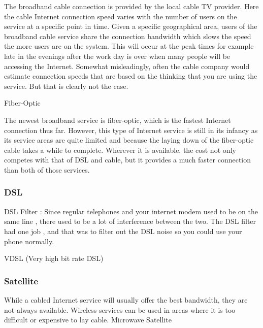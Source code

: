The broadband cable connection is provided by the local cable TV provider. Here
the cable Internet connection speed varies with the number of users on the
service at a specific point in time. Given a specific geographical area, users
of the broadband cable service share the connection bandwidth which slows the
speed the more users are on the system. This will occur at the peak times for
example late in the evenings after the work day is over when many people will be
accessing the Internet. Somewhat misleadingly, often the cable company would
estimate connection speeds that are based on the thinking that you are using the
service. But that is clearly not the case.

Fiber-Optic

The newest broadband service is fiber-optic, which is the fastest Internet
connection thus far. However, this type of Internet service is still in its
infancy as its service areas are quite limited and because the laying down of
the fiber-optic cable takes a while to complete. Wherever it is available, the
cost not only competes with that of DSL and cable, but it provides a much faster
connection than both of those services.


\subsubsectionend

\subsubsection{DSL}
\label{sssec:dsl}


DSL Filter : Since regular telephones and your internet modem used to be on the
same line , there used to be a lot of interference between the two. The DSL
filter had one job , and that was to filter out the DSL noise so you could use
your phone normally.


VDSL (Very high bit rate DSL)

\subsubsectionend

\subsubsection{Satellite}
\label{sssec:satellite}

While a cabled Internet service will usually offer the best bandwidth, they are not always available. Wireless services can be used in areas where it is too difficult or expensive to lay cable.
Microwave Satellite

